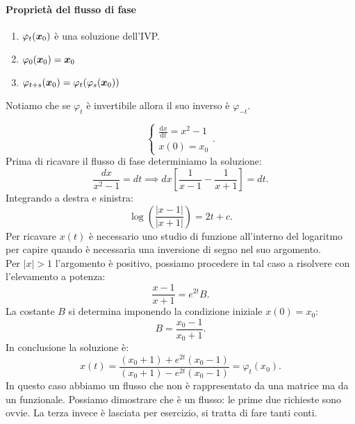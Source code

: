 \paragraph{Proprietà del flusso di fase}%
\label{par:Proprietà del flusso di fase}
\begin{enumerate}
    \item $\varphi_t(\boldsymbol{x}_0)$ è una soluzione dell'IVP.
    \item $\varphi_0(\boldsymbol{x}_0) = \boldsymbol{x}_0$ 
    \item $\varphi_{t+s}(\boldsymbol{x}_0)=\varphi_t(\varphi_s(\boldsymbol{x}_0))$ 
\end{enumerate}
Notiamo che se $\varphi_t$  è invertibile allora il suo inverso è $\varphi_{-t}$.  
\begin{exmp}
    \[
        \begin{cases}
            \frac{\text{d} x}{\text{d} t} = x^2-1\\
	    x(0) = x_0
        \end{cases}
    .\] 
    Prima di ricavare il flusso di fase determiniamo la soluzione:
    \[
        \frac{dx}{x^2-1} = dt \implies  dx \left[\frac{1}{x-1}-\frac{1}{x+1}\right] = dt
    .\] 
    Integrando a destra e sinistra:
    \[
	\log (\frac{\left|x-1\right|}{\left|x+1\right|}) = 2t + c
    .\] 
    Per ricavare $x(t)$  è necessario uno studio di funzione all'interno del logaritmo per capire quando è necessaria una inversione di segno nel suo argomento.\\
    Per $\left|x\right| > 1$  l'argomento è positivo, possiamo procedere in tal caso a risolvere con l'elevamento a potenza:
    \[
        \frac{x-1}{x+1}=e^{2t}B
    .\] 
    La costante $B$  si determina imponendo la condizione iniziale $x(0)=x_0$:
    \[
        B=\frac{x_0-1}{x_0+1}
    .\] 
    In conclusione la soluzione è:
    \[
	x(t) = \frac{(x_0+1)+e^{2t}(x_0-1)}{(x_0+1) -e^{2t}(x_0-1)} = \varphi_t(x_0)
    .\] 
    In questo caso abbiamo un flusso che non è rappresentato da una matrice ma da un funzionale. Possiamo dimostrare che è un flusso: le prime due richieste sono ovvie. La terza invece è lasciata per esercizio, si tratta di fare tanti conti.
\end{exmp}
\noindent

